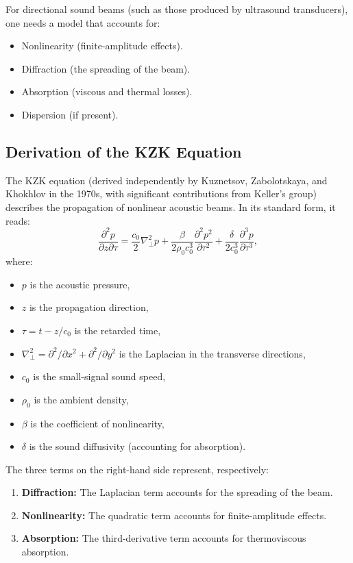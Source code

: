 For directional sound beams (such as those produced by ultrasound transducers), one needs a model that accounts for:
\begin{itemize}
  \item Nonlinearity (finite-amplitude effects).
  \item Diffraction (the spreading of the beam).
  \item Absorption (viscous and thermal losses).
  \item Dispersion (if present).
\end{itemize}

\subsection{Derivation of the KZK Equation}

The KZK equation (derived independently by Kuznetsov, Zabolotskaya, and Khokhlov in the 1970s, with significant contributions from Keller's group) describes the propagation of nonlinear acoustic beams. In its standard form, it reads:
\[
\frac{\partial^2 p}{\partial z \partial \tau} = \frac{c_0}{2} \nabla_\perp^2 p + \frac{\beta}{2\rho_0 c_0^3} \frac{\partial^2 p^2}{\partial \tau^2} + \frac{\delta}{2c_0^3} \frac{\partial^3 p}{\partial \tau^3},
\]
where:
\begin{itemize}
  \item \(p\) is the acoustic pressure,
  \item \(z\) is the propagation direction,
  \item \(\tau = t - z/c_0\) is the retarded time,
  \item \(\nabla_\perp^2 = \partial^2/\partial x^2 + \partial^2/\partial y^2\) is the Laplacian in the transverse directions,
  \item \(c_0\) is the small-signal sound speed,
  \item \(\rho_0\) is the ambient density,
  \item \(\beta\) is the coefficient of nonlinearity,
  \item \(\delta\) is the sound diffusivity (accounting for absorption).
\end{itemize}

The three terms on the right-hand side represent, respectively:
\begin{enumerate}
  \item \textbf{Diffraction:} The Laplacian term accounts for the spreading of the beam.
  \item \textbf{Nonlinearity:} The quadratic term accounts for finite-amplitude effects.
  \item \textbf{Absorption:} The third-derivative term accounts for thermoviscous absorption.
\end{enumerate}

